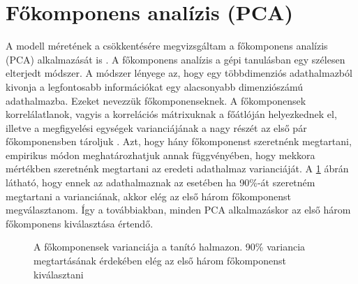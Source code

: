 \section{Főkomponens analízis (PCA)}
\label{ch:pca-methodology}

A modell méretének a csökkentésére megvizsgáltam a főkomponens analízis (PCA) alkalmazását is \cite{pca2010}. A főkomponens analízis a gépi tanulásban egy szélesen elterjedt módszer.  A módszer lényege az, hogy egy többdimenziós adathalmazból kivonja a legfontosabb információkat egy alacsonyabb dimenziószámú adathalmazba. Ezeket nevezzük főkomponenseknek. A főkomponensek korrelálatlanok, vagyis a korrelációs mátrixuknak a főátlóján helyezkednek el, illetve a megfigyelési egységek varianciájának a nagy részét az első pár főkomponensben tároljuk \cite{elek2011}. Azt, hogy hány főkomponenst szeretnénk megtartani, empirikus módon meghatározhatjuk annak függvényében, hogy mekkora mértékben szeretnénk megtartani az eredeti adathalmaz varianciáját. A \ref{fig:pca-variance} ábrán látható, hogy ennek az adathalmaznak az esetében ha 90\%-át szeretném megtartani a varianciának, akkor elég az első három főkomponenst megválasztanom. Így a továbbiakban, minden PCA alkalmazáskor az első három főkomponens kiválasztása értendő.

\varianceretention

\begin{figure}
    \caption{A főkomponensek varianciája a tanító halmazon. 90\% variancia megtartásának érdekében elég az első három főkomponenst kiválasztani}
    \label{fig:pca-variance}
\end{figure}

